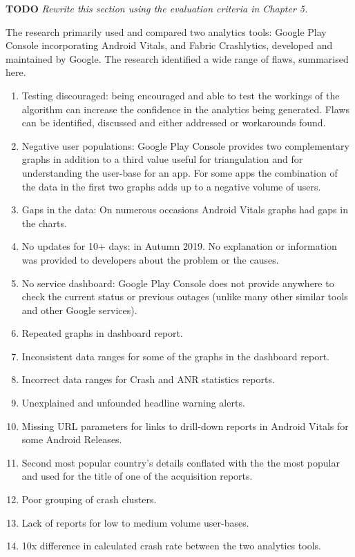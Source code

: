 \textbf{TODO} \textit{Rewrite this section using the evaluation criteria in Chapter 5.}

The research primarily used and compared two analytics tools: Google Play Console incorporating Android Vitals, and Fabric Crashlytics, developed and maintained by Google. The research identified a wide range of flaws, summarised here.

\begin{enumerate}
    \item Testing discouraged: being encouraged and able to test the workings of the algorithm can increase the confidence in the analytics being generated. Flaws can be identified, discussed and either addressed or workarounds found.
    \item Negative user populations: Google Play Console provides two complementary graphs in addition to a third value useful for triangulation and for understanding the user-base for an app. For some apps the combination of the data in the first two graphs adds up to a negative volume of users.
    \item Gaps in the data: On numerous occasions Android Vitals graphs had gaps in the charts.
    \item No updates for 10+ days: in Autumn 2019. No explanation or information was provided to developers about the problem or the causes. %
    \item No service dashboard: Google Play Console does not provide anywhere to check the current status or previous outages (unlike many other similar tools and other Google services).
    \item Repeated graphs in dashboard report.
    \item Inconsistent data ranges for some of the graphs in the dashboard report.
    \item Incorrect data ranges for Crash and ANR statistics reports.
    \item Unexplained and unfounded headline warning alerts.
    \item Missing URL parameters for links to drill-down reports in Android Vitals for some Android Releases.
    \item Second most popular country's details conflated with the the most popular and used for the title of one of the acquisition reports.
    \item Poor grouping of crash clusters.
    \item Lack of reports for low to medium volume user-bases.
    \item 10x difference in calculated crash rate between the two analytics tools.
\end{enumerate}

